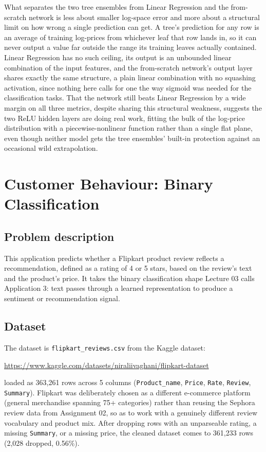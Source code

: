 \documentclass[11pt]{article}
\begin{document}
What separates the two tree ensembles from Linear Regression and the from-scratch network
is less about smaller log-space error and more about a structural limit on how wrong a
single prediction can get. A tree's prediction for any row is an average of training
log-prices from whichever leaf that row lands in, so it can never output a value far
outside the range its training leaves actually contained. Linear Regression has no such
ceiling, its output is an unbounded linear combination of the input features, and the
from-scratch network's output layer shares exactly the same structure, a plain linear
combination with no squashing activation, since nothing here calls for one the way sigmoid
was needed for the classification tasks. That the network still beats Linear Regression by
a wide margin on all three metrics, despite sharing this structural weakness, suggests the
two ReLU hidden layers are doing real work, fitting the bulk of the log-price distribution
with a piecewise-nonlinear function rather than a single flat plane, even though neither
model gets the tree ensembles' built-in protection against an occasional wild
extrapolation.

\newpage
\section{Customer Behaviour: Binary Classification}
\label{sec:customer_behaviour}

\subsection{Problem description}

This application predicts whether a Flipkart product review reflects a recommendation,
defined as a rating of 4 or 5 stars, based on the review's text and the product's price. It
takes the binary classification shape Lecture 03 calls Application 3: text passes through
a learned representation to produce a sentiment or recommendation signal.

\subsection{Dataset}

The dataset is \texttt{flipkart\_reviews.csv} from the Kaggle dataset:
\begin{center}
\small\url{https://www.kaggle.com/datasets/niraliivaghani/flipkart-dataset}
\end{center}
loaded as 363,261 rows across 5 columns
(\texttt{Product\_name}, \texttt{Price}, \texttt{Rate}, \texttt{Review},
\texttt{Summary}). Flipkart was deliberately chosen as a different e-commerce platform
(general merchandise spanning 75+ categories) rather than reusing the Sephora review data
from Assignment 02, so as to work with a genuinely different review vocabulary and product
mix. After dropping rows with an unparseable rating, a missing \texttt{Summary}, or a
missing price, the cleaned dataset comes to 361,233 rows (2,028 dropped, 0.56\%).
\end{document}

